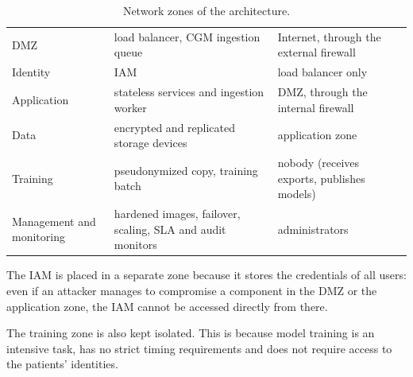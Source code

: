 \begin{table}[H]
\centering
\small
{}
\begin{tabularx}{\linewidth}{>{\raggedright\arraybackslash}p{3.4cm} Y >{\raggedright\arraybackslash}p{3.6cm}}
\toprule
{}
 &  &  \\
\midrule
DMZ                       & load balancer, CGM ingestion queue
                          & Internet, through the external firewall \\
Identity                  & IAM
                          & load balancer only \\
Application               & stateless services and ingestion worker
                          & DMZ, through the internal firewall \\
Data                      & encrypted and replicated storage devices
                          & application zone \\
Training                  & pseudonymized copy, training batch
                          & nobody (receives exports, publishes models) \\
Management and monitoring & hardened images, failover, scaling, SLA and
                            audit monitors
                          & administrators \\
\bottomrule
\end{tabularx}
\caption{Network zones of the architecture.}
\label{tab:zones}
\end{table}


The IAM is placed in a separate zone because it stores the credentials of all
users: even if an attacker manages to compromise a component in the
DMZ or the application zone, the IAM cannot be accessed directly from there.


The training zone is also kept isolated. This is because model training is an intensive task, has no strict timing requirements and does not require
access to the patients' identities.